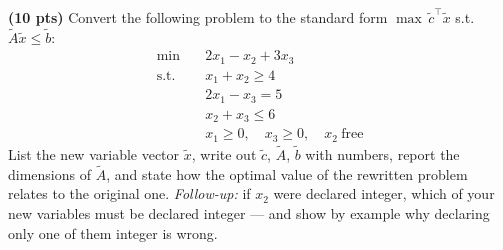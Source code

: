 \documentclass[10pt]{article}
\begin{document}
\begin{parts}
\item \textbf{(10 pts)} Convert the following problem to the standard form
  $\max\, \tilde c^{\top}\tilde x$ s.t.\ $\tilde A \tilde x \le \tilde b$:
  \[
  \begin{aligned}
    \min\quad & 2x_1 - x_2 + 3x_3 \\
    \text{s.t.}\quad & x_1 + x_2 \ge 4 \\
                     & 2x_1 - x_3 = 5 \\
                     & x_2 + x_3 \le 6 \\
                     & x_1 \ge 0, \quad x_3 \ge 0, \quad x_2 \ \text{free}
  \end{aligned}
  \]
  List the new variable vector $\tilde x$, write out $\tilde c$, $\tilde A$,
  $\tilde b$ with numbers, report the dimensions of $\tilde A$, and state how the
  optimal value of the rewritten problem relates to the original one.
  \emph{Follow-up:} if $x_2$ were declared integer, which of your new variables must
  be declared integer --- and show by example why declaring only one of them integer
  is wrong.


\end{parts}
\end{document}
